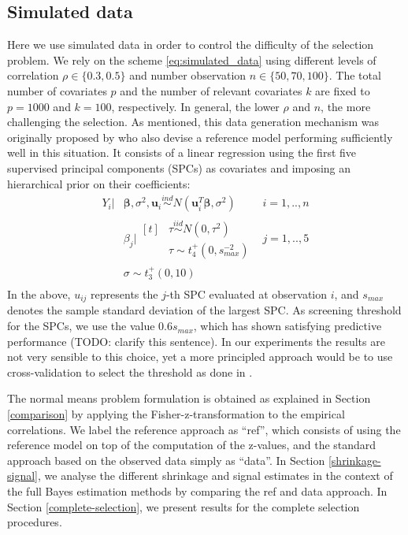 \documentclass[american,]{article}
\theoremstyle{definition}
\begin{document}
\hypertarget{simulated-data}{%
\subsection{Simulated data}\label{simulated-data}}

Here we use simulated data in order to control the difficulty of the selection problem. We rely on the scheme \eqref{eq:simulated_data} using different levels of correlation $\rho\in\{0.3,0.5\}$ and number observation $n\in\{50,70,100\}$. The total number of covariates $p$ and the number of relevant covariates $k$ are fixed to $p = 1000$ and $k = 100$, respectively. In general, the lower $\rho$ and $n$, the more challenging the selection. As mentioned, this data generation mechanism was originally proposed by \cite{paper:projpred} who also devise a reference model performing sufficiently well in this situation. It consists of a linear regression using the first five supervised principal components (SPCs) \citep{bair2006prediction, piironen2018} as covariates and imposing an
hierarchical prior on their coefficients:
\
\begin{equation}
\label{eq:ref_mod}
\begin{aligned}
    Y_{i}|&\boldsymbol{\beta},\sigma^{2},\boldsymbol{u}_{i} \overset{ind}{\sim} N(\boldsymbol{u}_{i}^{T}\boldsymbol{\beta},\sigma^{2}) \quad &i=1,..,n \\
    &\beta_{j}|\!\begin{aligned}[t] &\tau \overset{iid}{\sim} N(0,\tau^{2})\\
    &\tau \sim t_{4}^{+}(0,s_{max}^{-2}) 
    \end{aligned} &j=1,..,5 \\ 
    &\sigma \sim t_{3}^{+}(0,10) \\
\end{aligned}
\end{equation}
In the above, $u_{ij}$ represents the $j$-th SPC evaluated at observation $i$, and $s_{max}$ denotes the sample standard deviation of the largest SPC. As screening threshold for the SPCs, we use the value $0.6s_{max}$, which has shown satisfying predictive performance (TODO: clarify this sentence). In our experiments the results are not very sensible to this choice, yet a more principled approach would be to use cross-validation to select the threshold as done in \cite{paper:projpred}.

The normal means problem formulation is obtained as explained in Section \ref{comparison} by applying the Fisher-z-transformation to the empirical correlations. We label the reference approach as ``ref'', which consists of using the reference model on top of the computation of the z-values, and the standard approach based on the observed data simply as ``data''. In Section \ref{shrinkage-signal}, we analyse the different shrinkage and signal estimates in the context of the full Bayes estimation methods by comparing the ref and data approach. In Section \ref{complete-selection}, we present results for the complete selection procedures.
\end{document}
